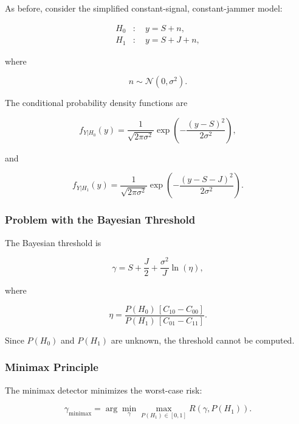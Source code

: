 \documentclass{article}
\begin{document}
As before, consider the simplified constant-signal, constant-jammer model:

\begin{align}
H_0 &: \quad y = S + n,\\
H_1 &: \quad y = S + J + n,
\end{align}

where

\begin{equation}
n \sim \mathcal{N}(0,\sigma^2).
\end{equation}

The conditional probability density functions are

\begin{equation}
f_{Y|H_0}(y)
=
\frac{1}{\sqrt{2\pi\sigma^2}}
\exp\left(
-\frac{(y-S)^2}{2\sigma^2}
\right),
\end{equation}

and

\begin{equation}
f_{Y|H_1}(y)
=
\frac{1}{\sqrt{2\pi\sigma^2}}
\exp\left(
-\frac{(y-S-J)^2}{2\sigma^2}
\right).
\end{equation}

\subsubsection{Problem with the Bayesian Threshold}

The Bayesian threshold is

\begin{equation}
\gamma
=
S+\frac{J}{2}
+
\frac{\sigma^2}{J}\ln(\eta),
\end{equation}

where

\begin{equation}
\eta
=
\frac{P(H_0)\,[C_{10}-C_{00}]}
     {P(H_1)\,[C_{01}-C_{11}]}.
\end{equation}

Since $P(H_0)$ and $P(H_1)$ are unknown, the threshold cannot be computed.

\subsubsection{Minimax Principle}

The minimax detector minimizes the worst-case risk:

\begin{equation}
\gamma_{\text{minimax}} = \arg\min_\gamma \max_{P(H_1) \in [0,1]} R(\gamma, P(H_1)).
\end{equation}
\end{document}
